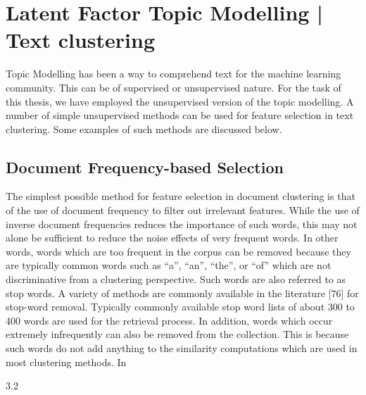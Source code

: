 \chapter{Latent Factor Topic Modelling | Text clustering}

Topic Modelling has been a way to comprehend text for the machine learning community. This can be of supervised or unsupervised nature. For the task of this thesis, we have employed the unsupervised version of the topic modelling. A number of simple unsupervised methods can be used for feature selection in text clustering. Some examples of such methods are discussed below.

\section{Document Frequency-based Selection}
The simplest possible method for feature selection in document clustering is that of the use of document frequency to filter out irrelevant features. While the use of inverse document frequencies reduces the importance of such words, this may not alone be sufficient to reduce the noise effects of very frequent words. In other words, words which are too frequent in the corpus can be removed because they are typically common words such as “a”, “an”, “the”, or “of” which are not discriminative from a clustering perspective. Such words are also referred to as stop words.
A variety of methods are commonly available in the literature [76] for stop-word removal.  Typically commonly available stop word lists of
about 300 to 400 words are used for the retrieval process. In addition,
words which occur extremely infrequently can also be removed from
the collection. This is because such words do not add anything to the
similarity computations which are used in most clustering methods. In



3.2


